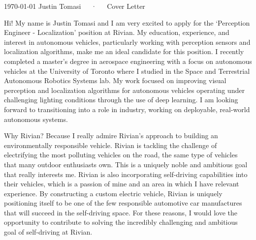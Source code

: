 \documentclass[11pt, a4paper]{awesome-cv}
\begin{document}
\makecvheader[C]

\makecvfooter
  {\today}
  {Justin Tomasi~~~·~~~Cover Letter}
  {}

\makelettertitle

\begin{cvletter}

Hi! My name is Justin Tomasi and I am very excited to apply for the `Perception Engineer - Localization' position at Rivian. My education, experience, and interest in autonomous vehicles, particularly working with perception sensors and localization algorithms, make me an ideal candidate for this position. I recently completed a master’s degree in aerospace engineering with a focus on autonomous vehicles at the University of Toronto where I studied in the Space and Terrestrial Autonomous Robotics Systems lab. My work focused on improving visual perception and localization algorithms for autonomous vehicles operating under challenging lighting conditions through the use of deep learning. I am looking forward to transitioning into a role in industry, working on deployable, real-world autonomous systems.  

Why Rivian? Because I really admire Rivian's approach to building an environmentally responsible vehicle. Rivian is tackling the challenge of electrifying the most polluting vehicles on the road, the same type of vehicles that many outdoor enthusiasts own. This is a uniquely noble and ambitious goal that really interests me. Rivian is also incorporating self-driving capabilities into their vehicles, which is a passion of mine and an area in which I have relevant experience. By constructing a custom electric vehicle, Rivian is uniquely positioning itself to be one of the few responsible automotive car manufactures that will succeed in the self-driving space. For these reasons, I would love the opportunity to contribute to solving the incredibly challenging and ambitious goal of self-driving at Rivian. 


\end{cvletter}
\end{document}
